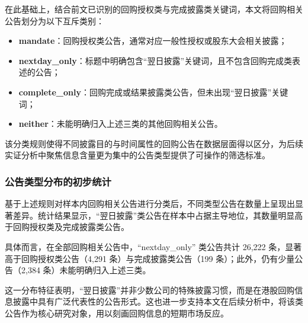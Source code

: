 \documentclass[a4paper,10pt]{article}
\begin{document}
在此基础上，结合前文已识别的回购授权类与完成披露类关键词，本文将回购相关公告划分为以下互斥类别：
\begin{itemize}
    \item \textbf{mandate}：回购授权类公告，通常对应一般性授权或股东大会相关披露；
    \item \textbf{nextday\_only}：标题中明确包含“翌日披露”关键词，且不包含回购完成类表述的公告；
    \item \textbf{complete\_only}：回购完成或结果披露类公告，但未出现“翌日披露”关键词；
    \item \textbf{neither}：未能明确归入上述三类的其他回购相关公告。
\end{itemize}

该分类规则使得不同披露目的与时间属性的回购公告在数据层面得以区分，为后续实证分析中聚焦信息含量更为集中的公告类型提供了可操作的筛选标准。

\subsubsection{公告类型分布的初步统计}

基于上述规则对样本内回购相关公告进行分类后，不同类型公告在数量上呈现出显著差异。统计结果显示，“翌日披露”类公告在样本中占据主导地位，其数量明显高于回购授权类及完成披露类公告。

具体而言，在全部回购相关公告中，“nextday\_only” 类公告共计 26,222 条，显著高于回购授权类公告（4,291 条）与完成披露类公告（199 条）；此外，仍有少量公告（2,384 条）未能明确归入上述三类。

这一分布特征表明，“翌日披露”并非少数公司的特殊披露习惯，而是在港股回购信息披露中具有广泛代表性的公告形式。这也进一步支持本文在后续分析中，将该类公告作为核心研究对象，用以刻画回购信息的短期市场反应。
\end{document}
